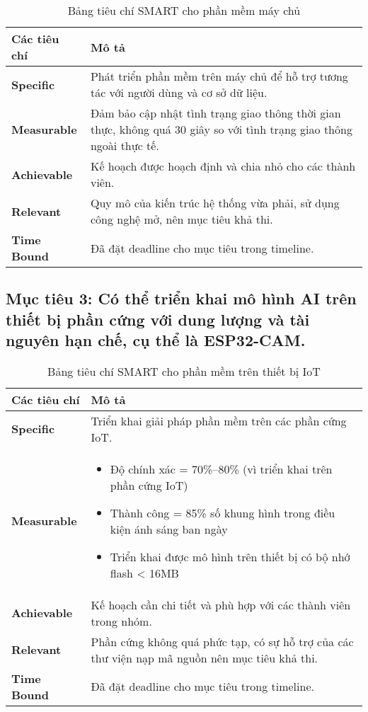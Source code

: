 \begin{table}[h!]
    \centering
    \begin{tabular}{|p{4cm}|p{10cm}|}
    \hline
    \textbf{Các tiêu chí} & \textbf{Mô tả} \\
    \hline
    \textbf{Specific} & Phát triển phần mềm trên máy chủ để hỗ trợ tương tác với người dùng và cơ sở dữ liệu. \\
    \hline
    \textbf{Measurable} & Đảm bảo cập nhật tình trạng giao thông thời gian thực, không quá 30 giây so với tình trạng giao thông ngoài thực tế. \\
    \hline
    \textbf{Achievable} & Kế hoạch được hoạch định và chia nhỏ cho các thành viên. \\
    \hline
    \textbf{Relevant} & Quy mô của kiến trúc hệ thống vừa phải, sử dụng công nghệ mở, nên mục tiêu khả thi. \\
    \hline
    \textbf{Time Bound} & Đã đặt deadline cho mục tiêu trong timeline. \\
    \hline
    \end{tabular}
    \caption{Bảng tiêu chí SMART cho phần mềm máy chủ}
\end{table}

\subsection*{Mục tiêu 3: Có thể triển khai mô hình AI trên thiết bị phần cứng với dung lượng và tài nguyên hạn chế, cụ thể là ESP32-CAM.}

\begin{table}[h!]
    \centering
    \begin{tabular}{|p{4cm}|p{10cm}|}
    \hline
    \textbf{Các tiêu chí} & \textbf{Mô tả} \\
    \hline
    \textbf{Specific} & Triển khai giải pháp phần mềm trên các phần cứng IoT. \\
    \hline
    \textbf{Measurable} & 
    \begin{itemize}
      \item Độ chính xác \>= 70\%–80\% (vì triển khai trên phần cứng IoT)
      \item Thành công \>= 85\% số khung hình trong điều kiện ánh sáng ban ngày
      \item Triển khai được mô hình trên thiết bị có bộ nhớ flash < 16MB
    \end{itemize}
    \\
    \hline
    \textbf{Achievable} & Kế hoạch cần chi tiết và phù hợp với các thành viên trong nhóm. \\
    \hline
    \textbf{Relevant} & Phần cứng không quá phức tạp, có sự hỗ trợ của các thư viện nạp mã nguồn nên mục tiêu khả thi. \\
    \hline
    \textbf{Time Bound} & Đã đặt deadline cho mục tiêu trong timeline. \\
    \hline
    \end{tabular}
    \caption{Bảng tiêu chí SMART cho phần mềm trên thiết bị IoT}
\end{table}


